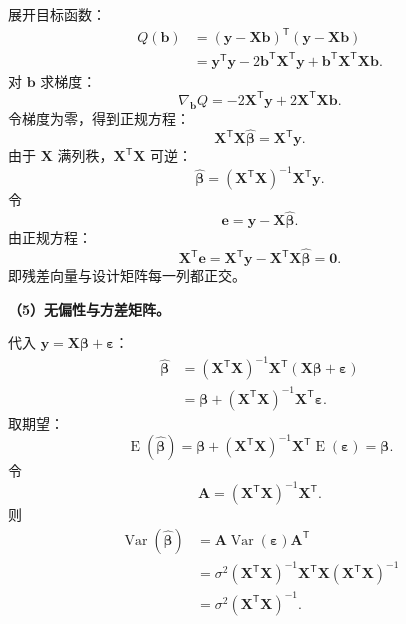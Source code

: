 \documentclass[11pt,a4paper]{article}
\newcommand{\E}{\operatorname{E}}
\newcommand{\Var}{\operatorname{Var}}
\newcommand{\by}{\mathbf{y}}
\newcommand{\bX}{\mathbf{X}}
\newcommand{\be}{\mathbf{e}}
\newcommand{\bbeta}{\boldsymbol{\beta}}
\newcommand{\bvarepsilon}{\boldsymbol{\varepsilon}}
\begin{document}
\begin{solutionbox}
展开目标函数：
\[
\begin{aligned}
  Q(\mathbf b)
  &=
  (\by-\bX\mathbf b)^\mathsf{T}(\by-\bX\mathbf b)\\
  &=
  \by^\mathsf{T}\by
  -2\mathbf b^\mathsf{T}\bX^\mathsf{T}\by
  +\mathbf b^\mathsf{T}\bX^\mathsf{T}\bX\mathbf b.
\end{aligned}
\]
对 $\mathbf b$ 求梯度：
\[
  \nabla_{\mathbf b}Q
  =
  -2\bX^\mathsf{T}\by
  +2\bX^\mathsf{T}\bX\mathbf b.
\]
令梯度为零，得到正规方程：
\[
  \bX^\mathsf{T}\bX\hat{\bbeta}
  =
  \bX^\mathsf{T}\by.
\]
由于 $\bX$ 满列秩，$\bX^\mathsf{T}\bX$ 可逆：
\[
  \boxed{
  \hat{\bbeta}
  =
  (\bX^\mathsf{T}\bX)^{-1}\bX^\mathsf{T}\by.
  }
\]
令
\[
  \be=\by-\bX\hat{\bbeta}.
\]
由正规方程：
\[
  \bX^\mathsf{T}\be
  =
  \bX^\mathsf{T}\by-\bX^\mathsf{T}\bX\hat{\bbeta}
  =
  \boxed{\mathbf0}.
\]
即残差向量与设计矩阵每一列都正交。

\textbf{（5）无偏性与方差矩阵。}

代入 $\by=\bX\bbeta+\bvarepsilon$：
\[
\begin{aligned}
  \hat{\bbeta}
  &=
  (\bX^\mathsf{T}\bX)^{-1}
  \bX^\mathsf{T}
  (\bX\bbeta+\bvarepsilon)\\
  &=
  \bbeta
  +
  (\bX^\mathsf{T}\bX)^{-1}
  \bX^\mathsf{T}\bvarepsilon.
\end{aligned}
\]
取期望：
\[
  \E(\hat{\bbeta})
  =
  \bbeta+
  (\bX^\mathsf{T}\bX)^{-1}
  \bX^\mathsf{T}\E(\bvarepsilon)
  =
  \boxed{\bbeta}.
\]
令
\[
  \mathbf A=(\bX^\mathsf{T}\bX)^{-1}\bX^\mathsf{T}.
\]
则
\[
\begin{aligned}
  \Var(\hat{\bbeta})
  &=
  \mathbf A\Var(\bvarepsilon)\mathbf A^\mathsf{T}\\
  &=
  \sigma^2
  (\bX^\mathsf{T}\bX)^{-1}
  \bX^\mathsf{T}\bX
  (\bX^\mathsf{T}\bX)^{-1}\\
  &=
  \boxed{
  \sigma^2(\bX^\mathsf{T}\bX)^{-1}.
  }
\end{aligned}
\]
\end{solutionbox}
\end{document}
